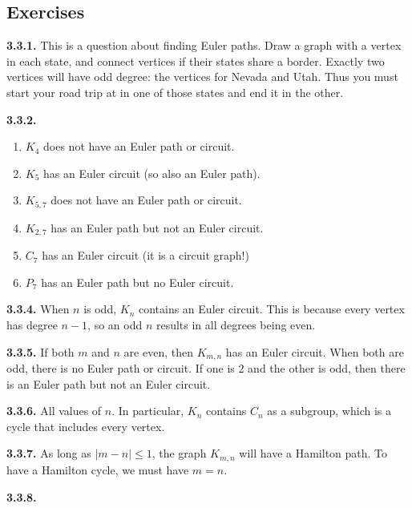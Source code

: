 \documentclass[10pt,]{book}
\theoremstyle{plain}
\theoremstyle{definition}
\theoremstyle{definition}
\theoremstyle{definition}
\theoremstyle{definition}
\numberwithin{equation}{chapter}
\begin{document}
\subsection*{ Exercises}
\noindent\textbf{3.3.1.} \hypertarget{p-1665}{}%
This is a question about finding Euler paths. Draw a graph with a vertex in each state, and connect vertices if their states share a border. Exactly two vertices will have odd degree: the vertices for Nevada and Utah. Thus you must start your road trip at in one of those states and end it in the other.%
\par\smallskip
\noindent\textbf{3.3.2.} \hypertarget{p-1667}{}%
\leavevmode%
\begin{enumerate}[label=(\alph*)]
\item\hypertarget{li-739}{}\(K_4\) does not have an Euler path or circuit.%
\item\hypertarget{li-740}{}\(K_5\) has an Euler circuit (so also an Euler path).%
\item\hypertarget{li-741}{}\(K_{5,7}\) does not have an Euler path or circuit.%
\item\hypertarget{li-742}{}\(K_{2,7}\) has an Euler path but not an Euler circuit.%
\item\hypertarget{li-743}{}\(C_7\) has an Euler circuit (it is a circuit graph!)%
\item\hypertarget{li-744}{}\(P_7\) has an Euler path but no Euler circuit.%
\end{enumerate}
%
\par\smallskip
\noindent\textbf{3.3.4.} \hypertarget{p-1674}{}%
When \(n\) is odd, \(K_n\) contains an Euler circuit. This is because every vertex has degree \(n-1\), so an odd \(n\) results in all degrees being even.%
\par\smallskip
\noindent\textbf{3.3.5.} \hypertarget{p-1676}{}%
If both \(m\) and \(n\) are even, then \(K_{m,n}\) has an Euler circuit. When both are odd, there is no Euler path or circuit. If one is 2 and the other is odd, then there is an Euler path but not an Euler circuit.%
\par\smallskip
\noindent\textbf{3.3.6.} \hypertarget{p-1678}{}%
All values of \(n\). In particular, \(K_n\) contains \(C_n\) as a subgroup, which is a cycle that includes every vertex.%
\par\smallskip
\noindent\textbf{3.3.7.} \hypertarget{p-1680}{}%
As long as \(|m-n| \le 1\), the graph \(K_{m,n}\) will have a Hamilton path. To have a Hamilton cycle, we must have \(m=n\).%
\par\smallskip
\noindent\textbf{3.3.8.} \hypertarget{p-1682}{}%
\end{document}
